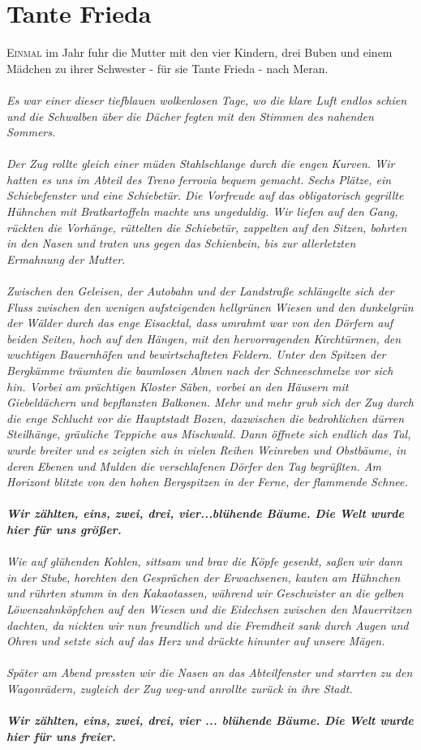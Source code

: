 \chapter{Tante Frieda}
\lettrine{E}{inmal} im Jahr fuhr die Mutter mit den vier Kindern, drei Buben und einem Mädchen zu ihrer Schwester - für sie Tante Frieda - nach Meran. \\\\
\textit{Es war einer dieser tiefblauen wolkenlosen Tage, wo die klare Luft endlos schien und die Schwalben über die Dächer fegten mit den Stimmen des nahenden Sommers.\\\\
Der Zug rollte gleich einer müden Stahlschlange durch die engen Kurven. Wir hatten es uns im Abteil des Treno ferrovia bequem gemacht. Sechs Plätze, ein Schiebefenster und eine Schiebetür. Die Vorfreude auf das obligatorisch gegrillte Hühnchen mit Bratkartoffeln machte uns ungeduldig. Wir liefen auf den Gang, rückten die Vorhänge, rüttelten die Schiebetür, zappelten auf den Sitzen, bohrten in den Nasen und traten uns gegen das Schienbein, bis zur allerletzten Ermahnung der Mutter. \\\\
Zwischen den Geleisen, der Autobahn und der Landstraße schlängelte sich der Fluss zwischen den wenigen aufsteigenden hellgrünen Wiesen und den dunkelgrün der Wälder durch das enge Eisacktal, dass umrahmt war von den Dörfern auf beiden Seiten, hoch auf den Hängen, mit den hervorragenden Kirchtürmen, den wuchtigen Bauernhöfen und bewirtschafteten Feldern. Unter den Spitzen der Bergkämme träumten die baumlosen Almen nach der Schneeschmelze vor sich hin. Vorbei am prächtigen Kloster Säben, vorbei an den Häusern mit Giebeldächern und bepflanzten Balkonen. Mehr und mehr grub sich der Zug durch die enge Schlucht vor die Hauptstadt Bozen, dazwischen die bedrohlichen dürren Steilhänge, gräuliche Teppiche aus Mischwald. Dann öffnete sich endlich das Tal, wurde breiter und es zeigten sich in vielen Reihen Weinreben und Obstbäume, in deren Ebenen und Mulden die verschlafenen Dörfer den Tag begrüßten. Am Horizont blitzte von den hohen Bergspitzen in der Ferne, der flammende Schnee.\\\\
\textbf{Wir zählten, eins, zwei, drei, vier...blühende Bäume. Die Welt wurde hier für uns größer.}\\\\
Wie auf glühenden Kohlen, sittsam und brav die Köpfe gesenkt, saßen wir dann in der Stube, horchten den Gesprächen der Erwachsenen, kauten am Hühnchen und rührten stumm in den Kakaotassen, während wir Geschwister an die gelben Löwenzahnköpfchen auf den Wiesen und die Eidechsen zwischen den Mauerritzen dachten, da nickten wir nun freundlich und die Fremdheit sank durch Augen und Ohren und setzte sich auf das Herz und drückte hinunter auf unsere Mägen. \\\\
Später am Abend pressten wir die Nasen an das Abteilfenster und starrten zu den Wagonrädern, zugleich der Zug weg-und anrollte zurück in ihre Stadt.\\\\
\textbf{Wir zählten, eins, zwei, drei, vier ... blühende Bäume. Die Welt wurde hier für uns freier.}
}
